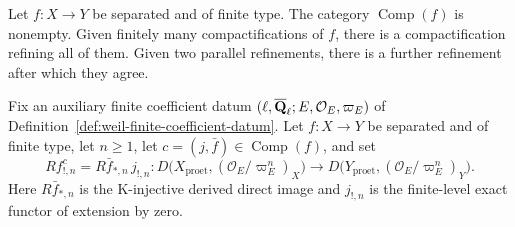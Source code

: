 
\begin{proposition}
\label{prop:compactification-refinement}


Let \(f:X\to Y\) be separated and of finite type.  The category
\(\operatorname{Comp}(f)\) is nonempty.  Given finitely many
compactifications of \(f\), there is a compactification refining all of
them.  Given two parallel refinements, there is a further refinement after
which they agree.
\end{proposition}



\begin{definition}
\label{def:compact-support-candidate}


Fix an auxiliary finite coefficient datum
\((\ell,\overline{\mathbf Q}_\ell;E,\mathcal O_E,\varpi_E)\) of
Definition~\ref{def:weil-finite-coefficient-datum}.  Let
\(f:X\to Y\) be separated and of finite type, let \(n\geq1\), let
\(c=(j,\bar f)\in\operatorname{Comp}(f)\), and set
\[
 Rf_{!,n}^{c}=R\bar f_{*,n}\,j_{!,n}:
 D\bigl(X_{\mathrm{proet}},(\mathcal O_E/\varpi_E^n)_X\bigr)
 \longrightarrow
 D\bigl(Y_{\mathrm{proet}},(\mathcal O_E/\varpi_E^n)_Y\bigr).
\]
Here \(R\bar f_{*,n}\) is the K-injective derived direct image and
\(j_{!,n}\) is the finite-level exact functor of extension by zero.
\end{definition}


